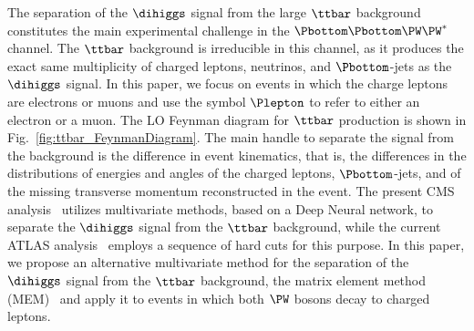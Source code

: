 The separation of the $\dihiggs$ signal from the large $\ttbar$ background constitutes the main experimental challenge in the $\Pbottom\Pbottom\PW\PW^{*}$ channel.
The $\ttbar$ background is irreducible in this channel, as it produces the exact same multiplicity of charged leptons, neutrinos, and $\Pbottom$-jets as the $\dihiggs$ signal.
In this paper, we focus on events in which the charge leptons are electrons or muons and use the symbol $\Plepton$ to refer to either an electron or a muon.
The LO Feynman diagram for $\ttbar$ production is shown in Fig.~\ref{fig:ttbar_FeynmanDiagram}.
The main handle to separate the signal from the background is the difference in event kinematics,
that is, the differences in the distributions of energies and angles of the charged leptons, $\Pbottom$-jets, and of the missing transverse momentum reconstructed in the event.
The present CMS analysis~\cite{HIG-17-006} utilizes multivariate methods,  based on a Deep Neural network,
to separate the $\dihiggs$ signal from the $\ttbar$ background, while the current ATLAS analysis~\cite{Aaboud:2018zhh} employs a sequence of hard cuts for this purpose.
In this paper, we propose an alternative multivariate method for the separation of the $\dihiggs$ signal from the $\ttbar$ background,
the matrix element method (MEM)~\cite{Kondo:1988yd,Kondo:1991dw} and apply it to events in which both $\PW$ bosons decay to charged leptons.

